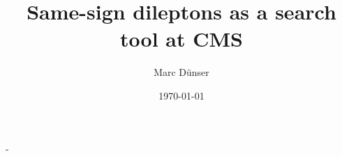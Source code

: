 \documentclass[11pt,a4paper,titlepage]{memoir} %
\title{Same-sign dileptons as a search tool at CMS}
\author{Marc D\"unser}
\date{\today}
\begin{document}
\frontmatter

\begin{titlingpage}
  \calccentering{\unitlength}
  \begin{adjustwidth*}{\unitlength-24pt}{-\unitlength-24pt}
    \maketitle
  \end{adjustwidth*}
\end{titlingpage}



\cleartorecto
\tableofcontents
\mainmatter









\appendix



\backmatter



\end{document}
